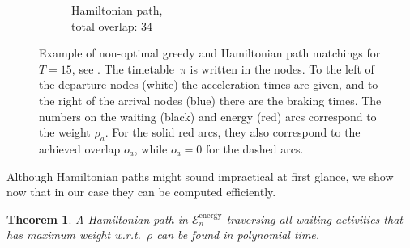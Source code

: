 \documentclass[11pt,a4paper]{article}
\newcommand{\energy}{\mathrm{energy}}
\newcommand{\w}{\rho} %
\newtheorem{theorem}{Theorem}[section]
\theoremstyle{definition}
\theoremstyle{remark}
\begin{document}
\begin{figure}
\begin{subfigure}{0.3\textwidth}
		\caption{Hamiltonian path, \\ total overlap: 34}
		\label{fig:ceright}
	\end{subfigure}

	
	\caption{Example of non-optimal greedy and Hamiltonian path matchings for $T = 15$, see \cite{atmos}. The timetable~$\pi$ is written in the nodes. To the left of the departure nodes (white) the acceleration times are given, and to the right of the arrival nodes (blue) there are the braking times. The numbers on the waiting (black) and energy (red) arcs correspond to the weight $\w_a$. For the solid red arcs, they also correspond to the achieved overlap $o_a$, while $o_a = 0$ for the dashed arcs.}
	\label{fig:exampleHP}
\end{figure}

Although Hamiltonian paths might sound impractical at first glance, we show now that in our case they can be computed efficiently. 

\begin{theorem}\label{thm:findpath}
	A Hamiltonian path 
    in $\mathcal E_n^\energy$ traversing all waiting activities that has maximum weight w.r.t.\ $\w$ can be found in polynomial time.
\end{theorem}
\end{document}
